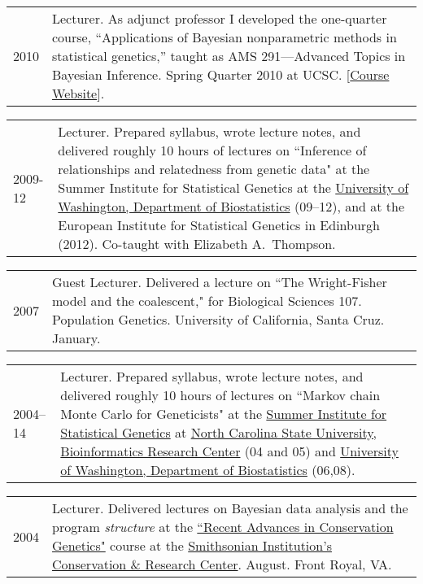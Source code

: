 \documentclass[11pt]{article}
\newlength{\myindent}
\newlength{\scndcol}
\begin{document}
\begin{tabular}{ @{}p{2.5\myindent} p{\scndcol}@{}  }
\hspace*{\myindent}2010 &  Lecturer.  As adjunct professor I developed the one-quarter course, ``Applications of Bayesian nonparametric methods in statistical genetics,'' taught as AMS 291---Advanced Topics in Bayesian Inference.  Spring Quarter 2010 at UCSC.  [\href{http://www.soe.ucsc.edu/classes/ams291/Spring10/}{Course Website}].
\end{tabular}


\begin{tabular}{ @{}p{2.5\myindent} p{\scndcol}@{}  }
\hspace*{\myindent}2009-12 &  Lecturer.  Prepared syllabus, wrote lecture notes, and delivered roughly 10 hours of lectures on ``Inference of relationships and relatedness from genetic data" at the Summer Institute for Statistical Genetics at the \href{http://www.biostat.washington.edu/}{University of Washington, Department of Biostatistics} (09--12), and at the European Institute for Statistical Genetics in Edinburgh (2012). Co-taught with Elizabeth A.~Thompson.
\end{tabular}


\begin{tabular}{ @{}p{2.5\myindent} p{\scndcol}@{}  }
\hspace*{\myindent}2007 &  Guest Lecturer.  Delivered a lecture on ``The Wright-Fisher model and  the coalescent," for Biological Sciences 107. Population Genetics.   University of California, Santa Cruz. January.
\end{tabular}


\begin{tabular}{ @{}p{2.5\myindent} p{\scndcol}@{}  }
\hspace*{\myindent}2004--14 &  Lecturer.  Prepared syllabus, wrote lecture notes, and delivered roughly 10 hours of lectures on ``Markov chain Monte Carlo for Geneticists" at the \href{http://www.biostat.washington.edu/sisg06/}{Summer Institute for Statistical Genetics} at    
\href{http://statgen.ncsu.edu/brcwebsite/home.php}{North Carolina State University, Bioinformatics Research Center} (04 and 05) and \href{http://www.biostat.washington.edu/}{University of Washington, Department of Biostatistics} (06,08).
\end{tabular}


\begin{tabular}{ @{}p{2.5\myindent} p{\scndcol}@{}  }
\hspace*{\myindent}2004 &  Lecturer.  Delivered lectures on Bayesian data analysis and the program {\sl structure} at the \href{http://home.ncifcrf.gov/ccr/lgd/geneticscourse/congen_2004/index_2004.asp}{``Recent Advances in Conservation Genetics"} course at the \href{http://nationalzoo.si.edu/ConservationAndScience/CRC/}{Smithsonian Institution's Conservation \& Research Center}.  August.   Front Royal, VA.
\end{tabular}
\end{document}
